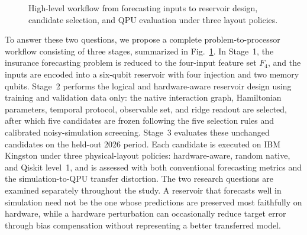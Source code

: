 \documentclass[journal]{IEEEtran}
\begin{document}
\begin{figure}[t]
{
}
\caption{High-level workflow from forecasting inputs to reservoir design, candidate selection, and QPU evaluation under three layout policies.}
\label{fig:workflow}
\end{figure}

To answer these two questions, we propose a complete problem-to-processor workflow consisting of three stages, summarized in Fig.~\ref{fig:workflow}.
In Stage~1, the insurance forecasting problem is reduced to the four-input feature set $F_4$, and the inputs are encoded into a six-qubit reservoir with four injection and two memory qubits. 
Stage~2 performs the logical and hardware-aware reservoir design using training and validation data only: the native interaction graph, Hamiltonian parameters, temporal protocol, observable set, and ridge readout are selected, after which five candidates are frozen following the five selection rules and calibrated noisy-simulation screening. 
Stage~3 evaluates these unchanged candidates on the held-out 2026 period. Each candidate is executed on IBM Kingston under three physical-layout policies: hardware-aware, random native, and Qiskit level~1, and is assessed with both conventional forecasting metrics and the simulation-to-QPU transfer distortion. 
The two research questions are examined separately throughout the study. A reservoir that forecasts well in simulation need not be the one whose predictions are preserved most faithfully on hardware, while a hardware perturbation can occasionally reduce target error through bias compensation without representing a better transferred model.
\end{document}
